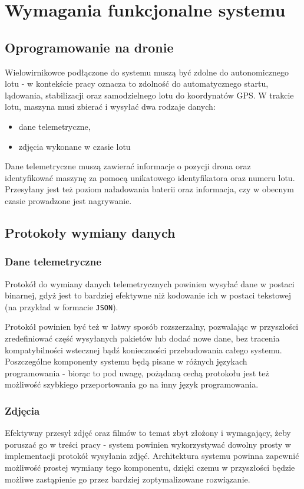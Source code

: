 \chapter{Wymagania funkcjonalne systemu}

\section{Oprogramowanie na dronie}

Wielowirnikowce podłączone do systemu muszą być
zdolne do autonomicznego lotu - w kontekście pracy
oznacza to zdolność do automatycznego startu,
lądowania, stabilizacji oraz samodzielnego
lotu do koordynatów GPS. W trakcie lotu, maszyna musi
zbierać i wysyłać dwa rodzaje danych:
\begin{itemize}
    \item dane telemetryczne,
    \item zdjęcia wykonane w czasie lotu
\end{itemize}

Dane telemetryczne muszą zawierać informacje o pozycji
drona oraz identyfikować maszynę za pomocą unikatowego
identyfikatora oraz numeru lotu. Przesyłany jest też
poziom naładowania baterii oraz informacja, czy w obecnym
czasie prowadzone jest nagrywanie.

\section{Protokoły wymiany danych}

\subsection{Dane telemetryczne}
Protokół do wymiany danych telemetrycznych powinien
wysyłać dane w postaci binarnej, gdyż jest to bardziej
efektywne niż kodowanie ich w postaci tekstowej (na
przykład w formacie \texttt{JSON}).

Protokół powinien być też w łatwy sposób rozszerzalny,
pozwalając w przyszłości zredefiniować część wysyłanych
pakietów lub dodać nowe dane, bez tracenia kompatybilności
wstecznej bądź konieczności przebudowania całego systemu.
Poszczególne komponenty systemu będą pisane w różnych
językach programowania - biorąc to pod uwagę, pożądaną
cechą protokołu jest też możliwość szybkiego przeportowania
go na inny język programowania. 

\subsection{Zdjęcia}
Efektywny przesył zdjęć oraz filmów to temat zbyt złożony
i wymagający, żeby poruszać go w treści pracy - system
powinien wykorzystywać dowolny prosty w implementacji
protokół wysyłania zdjęć. Architektura systemu powinna
zapewnić możliwość prostej wymiany tego komponentu, dzięki
czemu w przyszłości będzie możliwe zastąpienie go
przez bardziej zoptymalizowane rozwiązanie.

